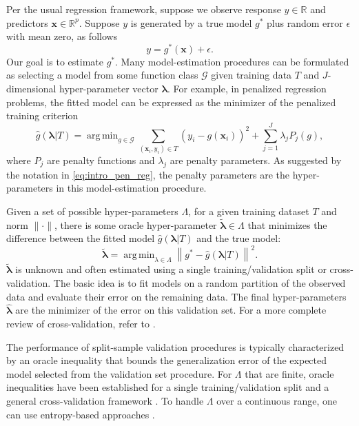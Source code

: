 \documentclass[12pt]{article} %
\theoremstyle{definition}
\DeclareMathOperator*{\argmin}{arg\,min}
\begin{document}
Per the usual regression framework, suppose we observe response $y \in \mathbb{R}$ and predictors $\boldsymbol {x} \in \mathbb{R}^p$. Suppose $y$ is generated by a true model $g^*$ plus random error $\epsilon$ with mean zero, as follows
\begin{equation}
\label{true_model}
y = g^*(\boldsymbol x) + \epsilon.
\end{equation}
Our goal is to estimate $g^*$.
Many model-estimation procedures can be formulated as selecting a model from some function class $\mathcal{G}$ given training data $T$ and $J$-dimensional hyper-parameter vector $\boldsymbol{\lambda}$. For example, in penalized regression problems, the fitted model can be expressed as the minimizer of the penalized training criterion
\begin{equation}
\label{eq:intro_pen_reg}
\hat{g}(\boldsymbol \lambda | T) = \argmin_{g\in \mathcal{G}} \sum_{(\boldsymbol{x}_i, y_i) \in T} \left (y_i -  g(\boldsymbol{x}_i) \right )^2 + \sum_{j=1}^J \lambda_j P_j(g),
\end{equation}
where $P_j$ are penalty functions and $\lambda_j$ are penalty parameters. As suggested by the notation in \eqref{eq:intro_pen_reg}, the penalty parameters are the hyper-parameters in this model-estimation procedure.

Given a set of possible hyper-parameters $\Lambda$, for a given training dataset $T$ and norm $\|\cdot\|$, there is some oracle hyper-parameter $\tilde{\boldsymbol{\lambda}} \in \Lambda$ that minimizes the difference between the fitted model $\hat{g}\left(\boldsymbol{\lambda|}T\right)$ and the true model:
\[
\tilde{\boldsymbol{\lambda}} = \argmin_{\lambda \in \Lambda} \left\|g^{*} - \hat{g}\left(\boldsymbol{\lambda|}T\right)\right\|^2.
\]
$\tilde{\boldsymbol{\lambda}}$ is unknown and often estimated using a single training/validation split or cross-validation. The basic idea is to fit models on a random partition of the observed data and evaluate their error on the remaining data. The final hyper-parameters $\hat{\boldsymbol{\lambda}}$ are the minimizer of the error on this validation set. For a more complete review of cross-validation, refer to \citet{arlot2010survey}.

The performance of split-sample validation procedures is typically characterized by an oracle inequality that bounds the generalization error of the expected model selected from the validation set procedure. For $\Lambda$ that are finite, oracle inequalities have been established for a single training/validation split \citep{gyorfi2006distribution} and a general cross-validation framework \citep{van2003unified, van2004asymptotic}. To handle $\Lambda$ over a continuous range, one can use entropy-based approaches \citep{lecue2012oracle}.
\end{document}
